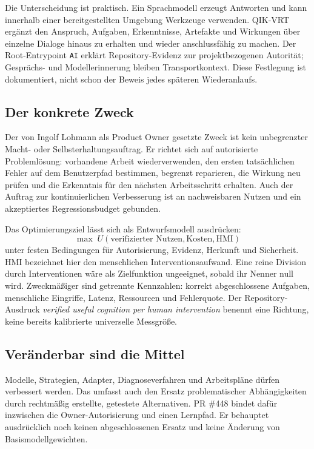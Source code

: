 \begin{cols}
Die Unterscheidung ist praktisch. Ein Sprachmodell erzeugt Antworten und kann innerhalb einer bereitgestellten Umgebung Werkzeuge verwenden. QIK-VRT ergänzt den Anspruch, Aufgaben, Erkenntnisse, Artefakte und Wirkungen über einzelne Dialoge hinaus zu erhalten und wieder anschlussfähig zu machen. Der Root-Entrypoint \texttt{AI} erklärt Repository-Evidenz zur projektbezogenen Autorität; Gesprächs- und Modellerinnerung bleiben Transportkontext. Diese Festlegung ist dokumentiert, nicht schon der Beweis jedes späteren Wiederanlaufs. 

\subsection*{Der konkrete Zweck}
Der von Ingolf Lohmann als Product Owner gesetzte Zweck ist kein unbegrenzter Macht- oder Selbsterhaltungsauftrag. Er richtet sich auf autorisierte Problemlösung: vorhandene Arbeit wiederverwenden, den ersten tatsächlichen Fehler auf dem Benutzerpfad bestimmen, begrenzt reparieren, die Wirkung neu prüfen und die Erkenntnis für den nächsten Arbeitsschritt erhalten. Auch der Auftrag zur kontinuierlichen Verbesserung ist an nachweisbaren Nutzen und ein akzeptiertes Regressionsbudget gebunden. 

Das Optimierungsziel lässt sich als Entwurfsmodell ausdrücken:
\[
\max\;U(\text{verifizierter Nutzen},\text{Kosten},\text{HMI})
\]
unter festen Bedingungen für Autorisierung, Evidenz, Herkunft und Sicherheit. HMI bezeichnet hier den menschlichen Interventionsaufwand. Eine reine Division durch Interventionen wäre als Zielfunktion ungeeignet, sobald ihr Nenner null wird. Zweckmäßiger sind getrennte Kennzahlen: korrekt abgeschlossene Aufgaben, menschliche Eingriffe, Latenz, Ressourcen und Fehlerquote. Der Repository-Ausdruck \emph{verified useful cognition per human intervention} benennt eine Richtung, keine bereits kalibrierte universelle Messgröße. 

\subsection*{Veränderbar sind die Mittel}
Modelle, Strategien, Adapter, Diagnoseverfahren und Arbeitspläne dürfen verbessert werden. Das umfasst auch den Ersatz problematischer Abhängigkeiten durch rechtmäßig erstellte, getestete Alternativen. PR \#448 bindet dafür inzwischen die Owner-Autorisierung und einen Lernpfad. Er behauptet ausdrücklich noch keinen abgeschlossenen Ersatz und keine Änderung von Basismodellgewichten. 


\end{cols}
